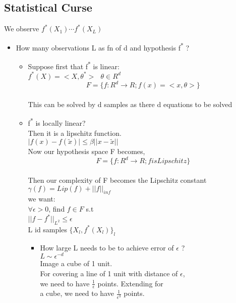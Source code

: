 \documentclass[11pt]{article}
\begin{document}
\subsection{Statistical Curse}
\label{sec:orgb0c6b43}
We observe \(f^*(X_1) \cdots f^*(X_L)\)\\
\begin{itemize}
\item How many observations L as fn of d and hypothesis f\textsuperscript{*} ?\\
\begin{itemize}
\item Suppose first that f\textsuperscript{*} is linear:\\
\(f^*(X) = <X,\theta^*>\ \ \ \theta \in R^d\)\\
\[F = \{ f: R^d \rightarrow R; f(x)= < x,\theta > \}\]\\
This can be solved by d samples as there d equations to be solved\\
\item f\textsuperscript{*} is locally linear?\\
Then it is a lipschitz function.\\
\(\lvert f(x) - f(\tilde{x}) \rvert \leq \beta \lvert\lvert x - \tilde{x} \rvert\rvert\)\\
Now our hypothesis space F becomes,\\
\[F = \{ f: R^d \rightarrow R; f is Lipschitz \}\]\\
Then our complexity of F becomes the Lipschitz constant\\
\(\gamma(f) = Lip(f) + \lvert\lvert f \rvert\rvert_{inf}\)\\
we want:\\
\(\forall \epsilon > 0\), find \(f \in F\) s.t\\
\(\lvert \lvert f - f^* \rvert\rvert_{L^2} \leq \epsilon\)\\
L id samples \(\{ X_l, f^*(X_l)\}_l\)\\
\begin{itemize}
\item How large L needs to be to achieve error of \(\epsilon\) ?\\
\(L \sim \epsilon^{-d}\)\\
Image a cube of 1 unit.\\
For covering a line of 1 unit with distance of \(\epsilon\),\\
 we need to have \(\frac{1}{\epsilon}\) points. Extending for\\
 a cube, we need to have \(\frac{1}{\epsilon^3}\) points.\\


\end{itemize}
\end{itemize}
\end{itemize}
\end{document}
